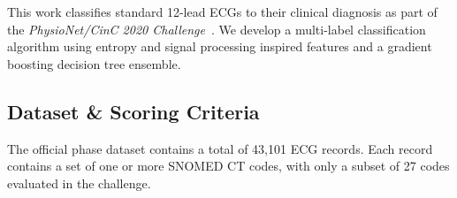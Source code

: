 \documentclass[twocolumn]{cinc}
\begin{document}
This work classifies standard 12-lead ECGs to their clinical diagnosis as part of the \emph{PhysioNet/CinC 2020 Challenge}~\cite{physionet_challenge_2020}.
We develop a multi-label classification algorithm using entropy and signal processing inspired features and a gradient boosting decision tree ensemble.

\subsection{Dataset \& Scoring Criteria}

The official phase dataset contains a total of 43,101 ECG records.
Each record contains a set of one or more SNOMED CT codes, with only a subset of 27 codes evaluated in the challenge.
\end{document}

